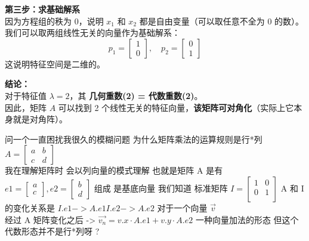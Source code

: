 \documentclass[12pt]{article}
\begin{document}
\begin{flushleft}
    \vspace{0.5em}
    \noindent\textbf{第三步：求基础解系} \\
    因为方程组的秩为 0，说明 $x_1$ 和 $x_2$ 都是自由变量（可以取任意不全为 0 的数）。\\
    我们可以取两组线性无关的向量作为基础解系：
    \[
        p_1 = \begin{bmatrix} 1 \\ 0 \end{bmatrix}, \quad p_2 = \begin{bmatrix} 0 \\ 1 \end{bmatrix}
    \]
    这说明特征空间是二维的。

    \vspace{0.5em}
    \noindent\textbf{结论：} \\
    对于特征值 $\lambda=2$，其 \textbf{几何重数(2) = 代数重数(2)}。\\
    因此，矩阵 $A$ 可以找到 2 个线性无关的特征向量，\textbf{该矩阵可对角化}（实际上它本身就是对角阵）。



    问一个一直困扰我很久的模糊问题 为什么矩阵乘法的运算规则是行*列
    $A = \begin{bmatrix}
            a & b \\
            c & d
        \end{bmatrix}$ \\
    我在理解矩阵时 会以列向量的模式理解 也就是矩阵 A 是有 $e1 = \begin{bmatrix}
            a \\
            c
        \end{bmatrix},e2 = \begin{bmatrix}
            b \\
            d
        \end{bmatrix}$ 组成 是基底向量 我们知道 标准矩阵 $I = \begin{bmatrix}
            1 & 0 \\
            0 & 1 \\
        \end{bmatrix}$ A 和 I 的变化关系是 $ I.e1 -> A.e1  I.e2 -> A.e2$ 对于一个向量 $\vec{v}$ \\
    经过 A 矩阵变化之后 -> $\vec{v_{n}} = v.x \cdot A.e1  + v.y \cdot A.e2 $ 一种向量加法的形态
    但这个代数形态并不是行*列呀 ?


\end{flushleft}
\end{document}
